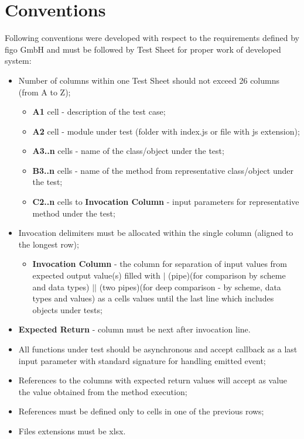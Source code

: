\chapter{Conventions}
\label{sec:convnetions}
Following conventions were developed with respect to the requirements defined by figo GmbH and must be followed by Test Sheet for proper work of developed system:
\begin{itemize}
	\item Number of columns within one Test Sheet should not exceed 26 columns (from A to Z);
	\begin{itemize}
		\item \textbf{A1} cell - description of the test case;
		\item \textbf{A2} cell - module under test (folder with index.js or file with js extension);
		\item \textbf{A3..n} cells - name of the class/object under the test;
		\item \textbf{B3..n} cells - name of the method from representative class/object under the test;
		\item \textbf{C2..n} cells to \textbf{Invocation Column}   - input parameters for representative method under the test;
	\end{itemize}
	\item Invocation delimiters must be allocated within the single column (aligned to the longest row);
	\begin{itemize}
		\item \textbf{Invocation Column} - the column for separation of input values from expected output value(s) filled with $|$ (pipe)(for comparison by scheme and data types) $||$ (two pipes)(for deep comparison - by scheme, data types and values) as a cells values until the last line which includes objects under tests;
	\end{itemize}
	\item \textbf{Expected Return} - column must be next after invocation line.
	\item All functions under test should be asynchronous and accept callback as a last input parameter with standard signature for handling emitted event;
	\item References to the columns with expected return values will accept as value the value obtained from the method execution;
	\item References must be defined only to cells in one of the previous rows;
	\item Files extensions must be xlsx.
\end{itemize}

